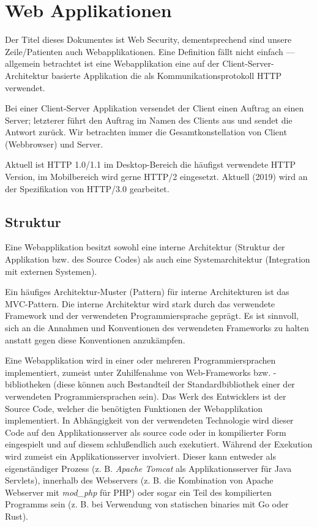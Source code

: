 \chapter{Web Applikationen}

Der Titel dieses Dokumentes ist Web Security, dementsprechend sind unsere Zeile/Patienten auch Webapplikationen. Eine Definition fällt nicht einfach --- allgemein betrachtet ist eine Webapplikation eine auf der Client-Server-Architektur basierte Applikation die als Kommunikationsprotokoll HTTP verwendet.

Bei einer Client-Server Applikation versendet der Client einen Auftrag an einen Server; letzterer führt den Auftrag im Namen des Clients aus und sendet die Antwort zurück. Wir betrachten immer die Gesamtkonstellation von Client (Webbrowser) und Server.

Aktuell ist HTTP 1.0/1.1 im Desktop-Bereich die häufigst verwendete HTTP Version, im Mobilbereich wird gerne HTTP/2 eingesetzt. Aktuell (2019) wird an der Spezifikation von HTTP/3.0 gearbeitet.

\section{Struktur}

Eine Webapplikation besitzt sowohl eine interne Architektur (Struktur der Applikation bzw. des Source Codes) als auch eine Systemarchitektur (Integration mit externen Systemen).

Ein häufiges Architektur-Muster (Pattern) für interne Architekturen ist das MVC-Pattern. Die interne Architektur wird stark durch das verwendete Framework und der verwendeten Programmiersprache geprägt. Es ist sinnvoll, sich an die Annahmen und Konventionen des verwendeten Frameworks zu halten anstatt gegen diese Konventionen anzukämpfen.

Eine Webapplikation wird in einer oder mehreren Programmiersprachen implementiert, zumeist unter Zuhilfenahme von Web-Frameworks bzw. -bibliotheken (diese können auch Bestandteil der Standardbibliothek einer der verwendeten Programmiersprachen sein). Das Werk des Entwicklers ist der Source Code, welcher die benötigten Funktionen der Webapplikation implementiert. In Abhängigkeit von der verwendeten Technologie wird dieser Code auf den Applikationsserver als source code oder in kompilierter Form eingespielt und auf diesem schlußendlich auch exekutiert. Während der Exekution wird zumeist ein Applikationsserver involviert. Dieser kann entweder als eigenständiger Prozess (z. B. \textit{Apache Tomcat} als Applikationsserver für Java Servlets), innerhalb des Webservers (z. B. die Kombination von Apache Webserver mit \textit{mod\_php} für PHP) oder sogar ein Teil des kompilierten Programms sein (z. B. bei Verwendung von statischen binaries mit Go oder Rust).

